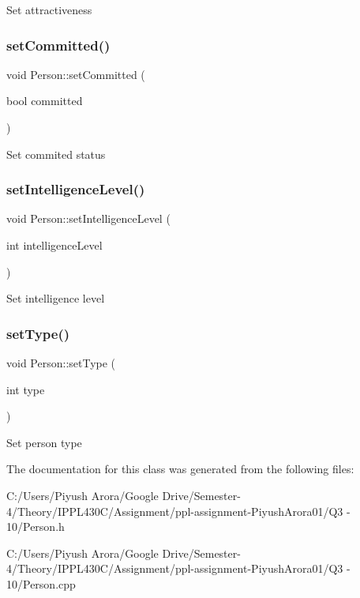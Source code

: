 Set attractiveness \mbox{\label{class_person_a96d58d6da36c25c246ae0fc9370084d2}} 
\subsubsection{\texorpdfstring{set\+Committed()}{setCommitted()}}
{\footnotesize\ttfamily void Person\+::set\+Committed (\begin{DoxyParamCaption}\item[{bool}]{committed }\end{DoxyParamCaption})}

Set commited status \mbox{\label{class_person_ac8633ca29c81c39e8aed74992633c720}} 
\subsubsection{\texorpdfstring{set\+Intelligence\+Level()}{setIntelligenceLevel()}}
{\footnotesize\ttfamily void Person\+::set\+Intelligence\+Level (\begin{DoxyParamCaption}\item[{int}]{intelligence\+Level }\end{DoxyParamCaption})}

Set intelligence level \mbox{\label{class_person_a02b0a78cc72c4808785c6e390bd06946}} 
\subsubsection{\texorpdfstring{set\+Type()}{setType()}}
{\footnotesize\ttfamily void Person\+::set\+Type (\begin{DoxyParamCaption}\item[{int}]{type }\end{DoxyParamCaption})}

Set person type 

The documentation for this class was generated from the following files\+:\begin{DoxyCompactItemize}
\item 
C\+:/\+Users/\+Piyush Arora/\+Google Drive/\+Semester-\/4/\+Theory/\+I\+P\+P\+L430\+C/\+Assignment/ppl-\/assignment-\/\+Piyush\+Arora01/\+Q3 -\/ 10/Person.\+h\item 
C\+:/\+Users/\+Piyush Arora/\+Google Drive/\+Semester-\/4/\+Theory/\+I\+P\+P\+L430\+C/\+Assignment/ppl-\/assignment-\/\+Piyush\+Arora01/\+Q3 -\/ 10/Person.\+cpp\end{DoxyCompactItemize}
